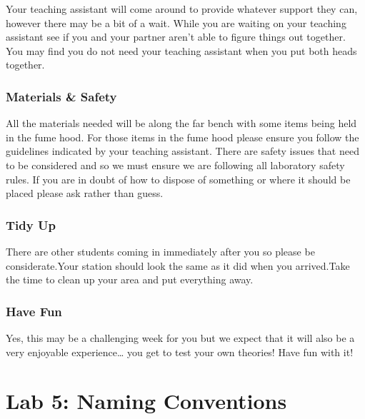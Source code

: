 \documentclass[
]{book}
\begin{document}
Your teaching assistant will come around to provide whatever support they can, however there may be a bit of a wait. While you are waiting on your teaching assistant see if you and your partner aren't able to figure things out together. You may find you do not need your teaching assistant when you put both heads together.

\hypertarget{materials-safety}{%
\subsection*{Materials \& Safety}\label{materials-safety}}

All the materials needed will be along the far bench with some items being held in the fume hood. For those items in the fume hood please ensure you follow the guidelines indicated by your teaching assistant. There are safety issues that need to be considered and so we must ensure we are following all laboratory safety rules. If you are in doubt of how to dispose of something or where it should be placed please ask rather than guess.

\hypertarget{tidy-up}{%
\subsection*{Tidy Up}\label{tidy-up}}

There are other students coming in immediately after you so please be considerate.Your station should look the same as it did when you arrived.Take the time to clean up your area and put everything away.

\hypertarget{have-fun}{%
\subsection*{Have Fun}\label{have-fun}}

Yes, this may be a challenging week for you but we expect that it will also be a very enjoyable experience\ldots{} you get to test your own theories! Have fun with it!

\hypertarget{lab-5-naming-conventions}{%
\chapter*{Lab 5: Naming Conventions}\label{lab-5-naming-conventions}}
\end{document}

